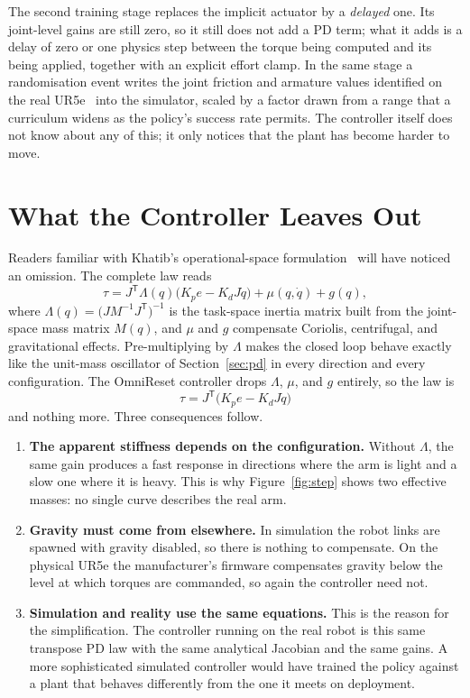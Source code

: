 \documentclass{article}
\newcommand{\T}{\mathsf{T}}
\newcommand{\Kp}{K_p}
\newcommand{\Kd}{K_d}
\begin{document}
The second training stage replaces the implicit actuator by a \emph{delayed} one. Its joint-level gains are still zero, so it still does not add a PD term; what it adds is a delay of zero or one physics step between the torque being computed and its being applied, together with an explicit effort clamp. In the same stage a randomisation event writes the joint friction and armature values identified on the real UR5e~\cite{bjelonic2025pace} into the simulator, scaled by a factor drawn from a range that a curriculum widens as the policy's success rate permits. The controller itself does not know about any of this; it only notices that the plant has become harder to move.

\section{What the Controller Leaves Out}
\label{sec:osc}

Readers familiar with Khatib's operational-space formulation~\cite{khatib1987unified} will have noticed an omission. The complete law reads
\begin{equation}
  \tau = J^\T\Lambda(q)\big(\Kp e-\Kd J\dot q\big) + \mu(q,\dot q) + g(q),
\end{equation}
where $\Lambda(q)=\big(JM^{-1}J^\T\big)^{-1}$ is the task-space inertia matrix built from the joint-space mass matrix $M(q)$, and $\mu$ and $g$ compensate Coriolis, centrifugal, and gravitational effects. Pre-multiplying by $\Lambda$ makes the closed loop behave exactly like the unit-mass oscillator of Section~\ref{sec:pd} in every direction and every configuration. The OmniReset controller drops $\Lambda$, $\mu$, and $g$ entirely, so the law is
\begin{equation}
  \tau = J^\T\big(\Kp e-\Kd J\dot q\big)
\end{equation}
and nothing more. Three consequences follow.
\begin{enumerate}
  \item \textbf{The apparent stiffness depends on the configuration.} Without $\Lambda$, the same gain produces a fast response in directions where the arm is light and a slow one where it is heavy. This is why Figure~\ref{fig:step} shows two effective masses: no single curve describes the real arm.
  \item \textbf{Gravity must come from elsewhere.} In simulation the robot links are spawned with gravity disabled, so there is nothing to compensate. On the physical UR5e the manufacturer's firmware compensates gravity below the level at which torques are commanded, so again the controller need not.
  \item \textbf{Simulation and reality use the same equations.} This is the reason for the simplification. The controller running on the real robot is this same transpose PD law with the same analytical Jacobian and the same gains. A more sophisticated simulated controller would have trained the policy against a plant that behaves differently from the one it meets on deployment.
\end{enumerate}
\end{document}
